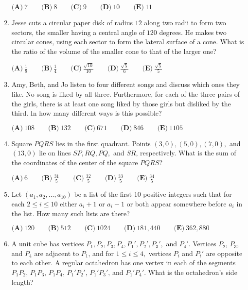 \documentclass{article}
\begin{document}
\begin{enumerate}[label=\arabic*., itemsep=0.5em]
\( \textbf{(A)}\ 7\qquad\textbf{(B)}\ 8\qquad\textbf{(C)}\ 9\qquad\textbf{(D)}\ 10\qquad\textbf{(E)}\ 11 \)\par \vspace{0.5em}\item Jesse cuts a circular paper disk of radius \(12\) along two radii to form two sectors, the smaller having a central angle of \(120\) degrees. He makes two circular cones, using each sector to form the lateral surface of a cone. What is the ratio of the volume of the smaller cone to that of the larger one?

\(\textbf{(A)}\ \frac{1}{8}\qquad\textbf{(B)}\ \frac{1}{4}\qquad\textbf{(C)}\ \frac{\sqrt{10}}{10}\qquad\textbf{(D)}\ \frac{\sqrt{5}}{6}\qquad\textbf{(E)}\ \frac{\sqrt{5}}{5}\)\par \vspace{0.5em}\item Amy, Beth, and Jo listen to four different songs and discuss which ones they like. No song is liked by all three. Furthermore, for each of the three pairs of the girls, there is at least one song liked by those girls but disliked by the third. In how many different ways is this possible?

\(\textbf{(A)}\ 108\qquad\textbf{(B)}\ 132\qquad\textbf{(C)}\ 671\qquad\textbf{(D)}\ 846\qquad\textbf{(E)}\ 1105 \)\par \vspace{0.5em}\item Square \(PQRS\) lies in the first quadrant. Points \((3,0), (5,0), (7,0),\) and \((13,0)\) lie on lines \(SP, RQ, PQ,\) and \(SR\), respectively. What is the sum of the coordinates of the center of the square \(PQRS\)?

\(\textbf{(A)}\ 6\qquad\textbf{(B)}\ \frac{31}{5}\qquad\textbf{(C)}\ \frac{32}{5}\qquad\textbf{(D)}\ \frac{33}{5}\qquad\textbf{(E)}\ \frac{34}{5} \)\par \vspace{0.5em}\item Let \((a_1,a_2, \dots ,a_{10})\) be a list of the first \(10\) positive integers such that for each \(2 \le i \le 10\) either \(a_i+1\) or \(a_i-1\) or both appear somewhere before \(a_i\) in the list. How many such lists are there?

\(\textbf{(A)}\ 120\qquad\textbf{(B)}\ 512\qquad\textbf{(C)}\ 1024\qquad\textbf{(D)}\ 181,440\qquad\textbf{(E)}\ 362,880\)\par \vspace{0.5em}\item A unit cube has vertices \(P_1,P_2,P_3,P_4,P_1',P_2',P_3',\) and \(P_4'\). Vertices \(P_2\), \(P_3\), and \(P_4\) are adjacent to \(P_1\), and for \(1\le i\le 4,\) vertices \(P_i\) and \(P_i'\) are opposite to each other. A regular octahedron has one vertex in each of the segments \(P_1P_2\), \(P_1P_3\), \(P_1P_4\), \(P_1'P_2'\), \(P_1'P_3'\), and \(P_1'P_4'\). What is the octahedron's side length?



\end{enumerate}
\end{document}
